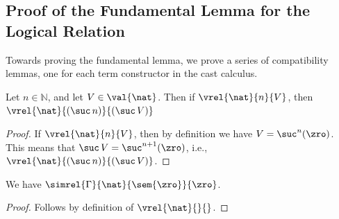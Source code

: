 \subsection{Proof of the Fundamental Lemma for the Logical Relation}

Towards proving the fundamental lemma, we prove a series of compatibility
lemmas, one for each term constructor in the cast calculus.

\begin{lemma}\label{lem:lr-nat}
    Let $n \in \mathbb{N}$, and let $V \in \val{\nat}$.
    Then if $\vrel{\nat}{n}{V}$, then $\vrel{\nat}{(\suc\, n)}{(\suc\, V)}$
\end{lemma}
\begin{proof}
    If $\vrel{\nat}{n}{V}$, then by definition we have $V = \suc^n(\zro)$. This
    means that $\suc\,V = \suc^{n+1}(\zro)$, i.e., $\vrel{\nat}{(\suc\,
    n)}{(\suc\, V)}$.
\end{proof}

\begin{lemma}
    We have $\simrel{\Gamma}{\nat}{\sem{\zro}}{\zro}$.
\end{lemma}
\begin{proof}
    Follows by definition of $\vrel{\nat}{}{}$.
\end{proof}


